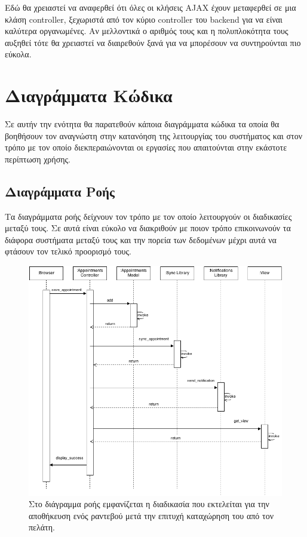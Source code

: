 Εδώ θα χρειαστεί να αναφερθεί ότι όλες οι κλήσεις AJAX έχουν μεταφερθεί σε μια κλάση controller, ξεχωριστά από τον κύριο controller του backend για να είναι καλύτερα οργανωμένες. Αν μελλοντικά ο αριθμός τους και η πολυπλοκότητα τους αυξηθεί τότε θα χρειαστεί να διαιρεθούν ξανά για να μπορέσουν να συντηρούνται πιο εύκολα.

\section{Διαγράμματα Κώδικα}
Σε αυτήν την ενότητα θα παρατεθούν κάποια διαγράμματα κώδικα τα οποία θα βοηθήσουν τον αναγνώστη στην κατανόηση της λειτουργίας του συστήματος και στον τρόπο με τον οποίο διεκπεραιώνονται οι εργασίες που απαιτούνται στην εκάστοτε περίπτωση χρήσης.

\subsection{Διαγράμματα Ροής}
Τα διαγράμματα ροής δείχνουν τον τρόπο με τον οποίο λειτουργούν οι διαδικασίες μεταξύ τους. Σε αυτά είναι εύκολο να διακριθούν με ποιον τρόπο επικοινωνούν τα διάφορα συστήματα μεταξύ τους και την πορεία των δεδομένων μέχρι αυτά να φτάσουν τον τελικό προορισμό τους. 

\begin{figure}[H]
\centering
\includegraphics[width=150mm]{images/sd-save-appointment.png}
\caption{Στο διάγραμμα ροής εμφανίζεται η διαδικασία που εκτελείται για την αποθήκευση ενός ραντεβού μετά την επιτυχή καταχώρηση του από τον πελάτη.}
\label{sd-save-appointment}
\end{figure}

